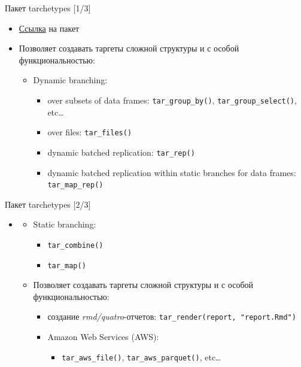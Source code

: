\documentclass[
  ignorenonframetext,
]{beamer}
\providecommand{\tightlist}{%
  \setlength{\itemsep}{0pt}\setlength{\parskip}{0pt}}\usepackage{longtable,booktabs,array}
\begin{document}
\begin{frame}[fragile]{Пакет tarchetypes {[}1/3{]}}
\label{ux43fux430ux43aux435ux442-tarchetypes-13}
\begin{itemize}
\item
  \href{https://docs.ropensci.org/tarchetypes/}{Ссылка} на пакет
\item
  Позволяет создавать таргеты сложной структуры и с особой
  функциональностью:

  \begin{itemize}
  \item
    Dynamic branching:

    \begin{itemize}
    \item
      over subsets of data frames: \texttt{tar\_group\_by()},
      \texttt{tar\_group\_select()}, etc\ldots{}
    \item
      over files: \texttt{tar\_files()}
    \item
      dynamic batched replication: \texttt{tar\_rep()}
    \item
      dynamic batched replication within static branches for data
      frames: \texttt{tar\_map\_rep()}
    \end{itemize}
  \end{itemize}
\end{itemize}
\end{frame}

\begin{frame}[fragile]{Пакет tarchetypes {[}2/3{]}}
\label{ux43fux430ux43aux435ux442-tarchetypes-23}
\begin{itemize}
\item
  \begin{itemize}
  \item
    Static branching:

    \begin{itemize}
    \item
      \texttt{tar\_combine()}
    \item
      \texttt{tar\_map()}
    \end{itemize}
  \item
    Позволяет создавать таргеты сложной структуры и с особой
    функциональностью:

    \begin{itemize}
    \item
      создание \emph{rmd/quatro}-отчетов:
      \texttt{tar\_render(report,\ "report.Rmd")}
    \item
      Amazon Web Services (AWS):

      \begin{itemize}
      \tightlist
      \item
        \texttt{tar\_aws\_file()}, \texttt{tar\_aws\_parquet()},
        etc\ldots{}
      \end{itemize}
    \end{itemize}
  \end{itemize}
\end{itemize}
\end{frame}
\end{document}
